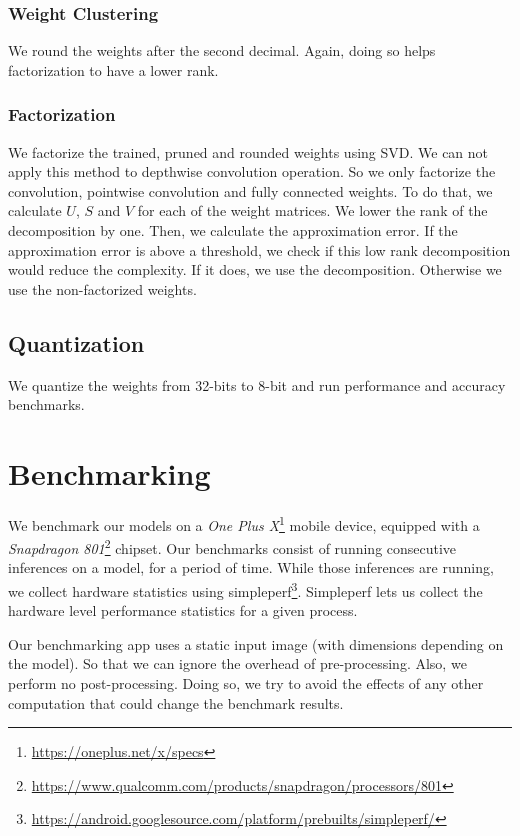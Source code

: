 \subsubsection{Weight Clustering}
We round the weights after the second decimal. Again, doing so helps factorization to have a lower rank. 

\subsubsection{Factorization}
We factorize the trained, pruned and rounded weights using SVD. We can not apply this method to depthwise convolution operation. So we only factorize the convolution, pointwise convolution and fully connected weights. To do that, we calculate $U$, $S$ and $V$ for each of the weight matrices. We lower the rank of the decomposition by one. Then, we calculate the approximation error. If the approximation error is above a threshold, we check if this low rank decomposition would reduce the complexity. If it does, we use the decomposition. Otherwise we use the non-factorized weights. 

\subsection{Quantization}
We quantize the weights from 32-bits to 8-bit and run performance and accuracy benchmarks.

\section{Benchmarking}
We benchmark our models on a \textit{One Plus X}\footnote{\url{https://oneplus.net/x/specs}} mobile device, equipped with a \textit{Snapdragon 801}\footnote{\url{https://www.qualcomm.com/products/snapdragon/processors/801}} chipset. Our benchmarks consist of running consecutive inferences on a model, for a period of time. While those inferences are running, we collect hardware statistics using simpleperf\footnote{\url{https://android.googlesource.com/platform/prebuilts/simpleperf/}}. Simpleperf lets us collect the hardware level performance statistics for a given process.

Our benchmarking app uses a static input image (with dimensions depending on the model). So that we can ignore the overhead of pre-processing. Also, we perform no post-processing. Doing so, we try to avoid the effects of any other computation that could change the benchmark results. 

